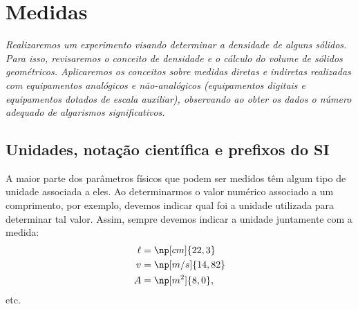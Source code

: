 \chapter{Medidas}
\label{Chap:ExpMedidas}

\begin{fullwidth}\it
	Realizaremos um experimento visando determinar a densidade de alguns sólidos. Para isso, revisaremos o conceito de densidade e o cálculo do volume de sólidos geométricos. Aplicaremos os conceitos sobre medidas diretas e indiretas realizadas com equipamentos analógicos e não-analógicos (equipamentos digitais e equipamentos dotados de escala auxiliar), observando ao obter os dados o número adequado de algarismos significativos.
\end{fullwidth}

\section{Unidades, notação científica e prefixos do SI}

A maior parte dos parâmetros físicos que podem ser medidos têm algum tipo de unidade associada a eles. Ao determinarmos o valor numérico associado a um comprimento, por exemplo, devemos indicar qual foi a unidade utilizada para determinar tal valor. Assim, sempre devemos indicar a unidade juntamente com a medida:
\begin{align}
    \ell &= \np[cm]{22,3} \\
    v &= \np[m/s]{14,82} \\
    A &= \np[m^2]{8,0},
\end{align}
%
etc.


